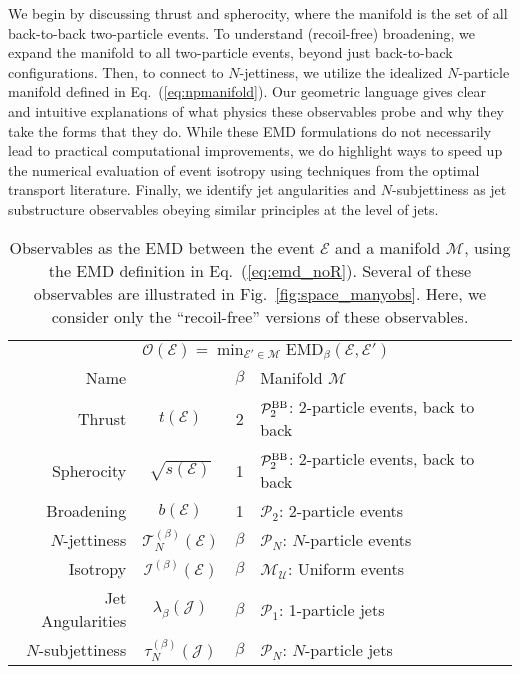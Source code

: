 \documentclass[letterpaper,11pt]{article}
\DeclareRobustCommand{\Fig}[1]{Fig.~\ref{#1}}
\DeclareRobustCommand{\Eq}[1]{Eq.~(\ref{#1})}
\begin{document}
We begin by discussing thrust and spherocity, where the manifold is the set of all back-to-back two-particle events.
%
To understand (recoil-free) broadening, we expand the manifold to all two-particle events, beyond just back-to-back configurations.
%
Then, to connect to $N$-jettiness, we utilize the idealized $N$-particle manifold defined in \Eq{eq:npmanifold}.
%
Our geometric language gives clear and intuitive explanations of what physics these observables probe and why they take the forms that they do.
%
While these EMD formulations do not necessarily lead to practical computational improvements, we do highlight ways to speed up the numerical evaluation of event isotropy using techniques from the optimal transport literature.
%
Finally, we identify jet angularities and $N$-subjettiness as jet substructure observables obeying similar principles at the level of jets.



\begin{table}[p]
\centering
\begin{tabular}{rccl}
\hline
\hline
  & \multicolumn{3}{l}{$\mathcal O(\mathcal E)=\displaystyle \min_{\mathcal E'\in\mathcal M} \text{EMD}_\beta(\mathcal E, \mathcal E')$} \\
 Name &  & $\beta$ & Manifold $\mathcal M$ \\ \hline\hline
Thrust & $t(\mathcal E)$ & 2& $\mathcal P^{\rm BB}_2$:  2-particle events, back to back \\
Spherocity & $\sqrt{s(\mathcal E)}$ & 1 &  $\mathcal P^{\rm BB}_2$:  2-particle events, back to back \\ 
Broadening & $b(\mathcal E)$ & 1 & $\mathcal P_2$:  2-particle events \\ 
$N$-jettiness & $\mathcal T_N^{(\beta)} (\mathcal E)$& $\beta$ & $\mathcal P_N$:  $N$-particle events \\ 
Isotropy & $\mathcal I^{(\beta)}(\mathcal E)$ & $\beta$ & $\mathcal M_{\mathcal{U}}$: Uniform events\\
\hline
Jet Angularities & $\lambda_\beta(\mathcal J)$ & $\beta$ & $\mathcal P_1$:   1-particle jets\\ 
$N$-subjettiness & $\tau_N^{(\beta)}(\mathcal J)$ & $\beta$ & $\mathcal P_N$:   $N$-particle jets \\ 
\hline
\hline
\end{tabular}
\caption{Observables as the EMD between the event $\mathcal E$ and a manifold $\mathcal{M}$, using the EMD definition in \Eq{eq:emd_noR}.
%
Several of these observables are illustrated in \Fig{fig:space_manyobs}.
%
Here, we consider only the ``recoil-free'' versions of these observables.}
\label{tab:obs}
\end{table}
\end{document}
